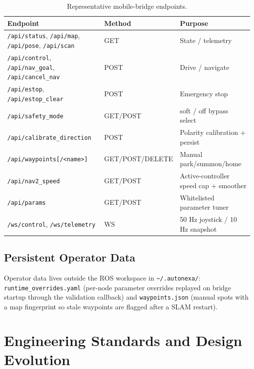 \documentclass[12pt,a4paper]{report}
\begin{document}
\begin{table}[H]
\centering
\caption{Representative mobile-bridge endpoints.}
\label{tab:endpoints}
\begin{tabularx}{\textwidth}{|p{4.6cm}|p{2.2cm}|X|}
\hline
\textbf{Endpoint} & \textbf{Method} & \textbf{Purpose} \\
\hline
\texttt{/api/status}, \texttt{/api/map}, \texttt{/api/pose}, \texttt{/api/scan} & GET & State / telemetry \\
\hline
\texttt{/api/control}, \texttt{/api/nav\_goal}, \texttt{/api/cancel\_nav} & POST & Drive / navigate \\
\hline
\texttt{/api/estop}, \texttt{/api/estop\_clear} & POST & Emergency stop \\
\hline
\texttt{/api/safety\_mode} & GET/POST & soft / off bypass select \\
\hline
\texttt{/api/calibrate\_direction} & POST & Polarity calibration + persist \\
\hline
\texttt{/api/waypoints[/<name>]} & GET/POST/DELETE & Manual park/summon/home \\
\hline
\texttt{/api/nav2\_speed} & GET/POST & Active-controller speed cap + smoother \\
\hline
\texttt{/api/params} & GET/POST & Whitelisted parameter tuner \\
\hline
\texttt{/ws/control}, \texttt{/ws/telemetry} & WS & 50 Hz joystick / 10 Hz snapshot \\
\hline
\end{tabularx}
\end{table}

\section{Persistent Operator Data}

Operator data lives outside the ROS workspace in \texttt{\textasciitilde/.autonexa/}:
\texttt{runtime\_overrides.yaml} (per-node parameter overrides replayed on bridge
startup through the validation callback) and \texttt{waypoints.json} (manual
spots with a map fingerprint so stale waypoints are flagged after a SLAM restart).

\chapter{Engineering Standards and Design Evolution}
\label{ch:standards}
\end{document}

